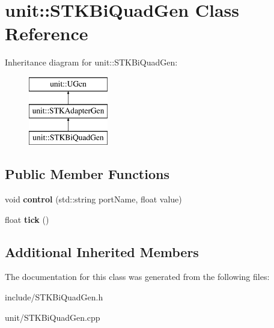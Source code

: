 \hypertarget{classunit_1_1STKBiQuadGen}{}\section{unit\+:\+:S\+T\+K\+Bi\+Quad\+Gen Class Reference}
\label{classunit_1_1STKBiQuadGen}
Inheritance diagram for unit\+:\+:S\+T\+K\+Bi\+Quad\+Gen\+:\begin{figure}[H]
\begin{center}
\leavevmode
\includegraphics[height=3.000000cm]{classunit_1_1STKBiQuadGen}
\end{center}
\end{figure}
\subsection*{Public Member Functions}
\begin{DoxyCompactItemize}
\item 
void {\bfseries control} (std\+::string port\+Name, float value)\hypertarget{classunit_1_1STKBiQuadGen_afbaea4e23ab453fdeaa0069ddd8002a6}{}\label{classunit_1_1STKBiQuadGen_afbaea4e23ab453fdeaa0069ddd8002a6}

\item 
float {\bfseries tick} ()\hypertarget{classunit_1_1STKBiQuadGen_aeaa64c8ff587d9a9089b4cf3276255b9}{}\label{classunit_1_1STKBiQuadGen_aeaa64c8ff587d9a9089b4cf3276255b9}

\end{DoxyCompactItemize}
\subsection*{Additional Inherited Members}


The documentation for this class was generated from the following files\+:\begin{DoxyCompactItemize}
\item 
include/S\+T\+K\+Bi\+Quad\+Gen.\+h\item 
unit/S\+T\+K\+Bi\+Quad\+Gen.\+cpp\end{DoxyCompactItemize}

